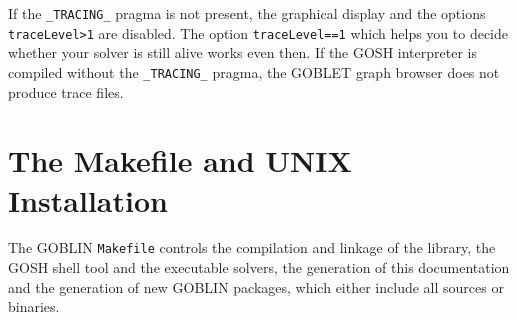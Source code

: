 \documentclass[a4paper,11pt,twoside]{book}
\begin{document}
\begin{multicols}{2}
If the \verb/_TRACING_/ pragma is not present, the graphical display and the
options \verb/traceLevel>1/ are disabled. The option \verb/traceLevel==1/ which
helps you to decide whether your solver is still alive works even then. If the
GOSH interpreter is compiled without the \verb/_TRACING_/ pragma, the GOBLET
graph browser does not produce trace files.



\section{The Makefile and UNIX Installation}
\label{slb_make}

The GOBLIN \verb/Makefile/ controls the compilation and linkage of the library,
the GOSH shell tool and the executable solvers, the generation of this
documentation and the generation of new GOBLIN packages, which either include
all sources or binaries.


\end{multicols}
\end{document}

